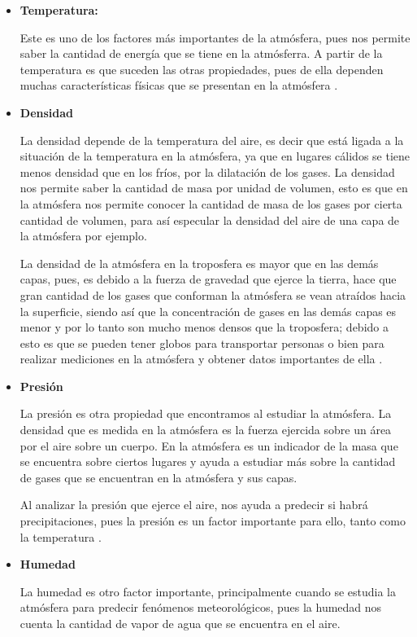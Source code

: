 \documentclass[12pt]{article}
\begin{document}
\begin{itemize}
\item \textbf{Temperatura:}

Este es uno de los factores más importantes de la atmósfera, pues nos permite saber la cantidad de energía que se tiene en la atmósferra. A partir de la temperatura es que suceden las otras propiedades, pues de ella dependen muchas características físicas que se presentan en la atmósfera \cite{temp}.

\item \textbf{Densidad}

La densidad depende de la temperatura del aire, es decir que está ligada a la situación de la temperatura en la atmósfera, ya que en lugares cálidos se tiene menos densidad que en los fríos, por la dilatación de los gases. La densidad nos permite saber la cantidad de masa por unidad de volumen, esto es que en la atmósfera nos permite conocer la cantidad de masa de los gases por cierta cantidad de volumen, para así especular la densidad del aire de una capa de la atmósfera por ejemplo.

La densidad de la atmósfera en la troposfera es mayor que en las demás capas, pues, es debido a la fuerza de gravedad que ejerce la tierra, hace que gran cantidad de los gases que conforman la atmósfera se vean atraídos hacia la superficie, siendo así que la concentración de gases en las demás capas es menor y por lo tanto son mucho menos densos que la troposfera; debido a esto es que se pueden tener globos para transportar personas o bien para realizar mediciones en la atmósfera y obtener datos importantes de ella \cite{den}.

\item \textbf{Presión}

La presión es otra propiedad que encontramos al estudiar la atmósfera. La densidad que es medida en la atmósfera es la fuerza ejercida sobre un área por el aire sobre un cuerpo. En la atmósfera es un indicador de la masa que se encuentra sobre ciertos lugares y ayuda a estudiar más sobre la cantidad de gases que se encuentran en la atmósfera y sus capas.

Al analizar la presión que ejerce el aire, nos ayuda a predecir si habrá precipitaciones, pues la presión es un factor importante para ello, tanto como la temperatura \cite{pres}.

\item \textbf{Humedad}

La humedad es otro factor importante, principalmente cuando se estudia la atmósfera para predecir fenómenos meteorológicos, pues la humedad nos cuenta la cantidad de vapor de agua que se encuentra en el aire.


\end{itemize}
\end{document}
